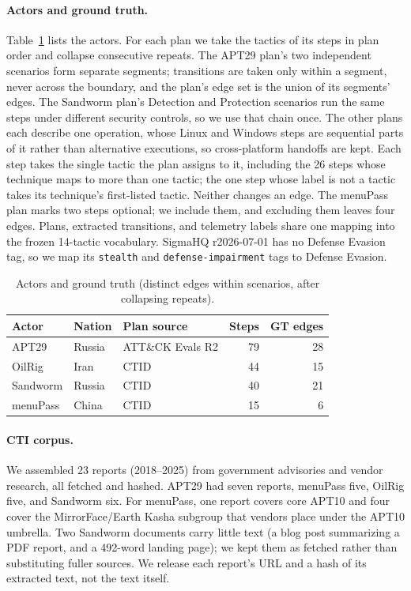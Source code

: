\documentclass[letterpaper]{article} %
\newif\ifflags
\newcommand{\flag}[1]{\ifflags\textcolor{red}{\textsuperscript{\textbf{[#1]}}}\fi}
\begin{document}
\paragraph{Actors and ground truth.} Table~\ref{tab:actors} lists the actors. For each plan we take the tactics of its steps in plan order and collapse consecutive repeats. The APT29 plan's two independent scenarios form separate segments; transitions are taken only within a segment, never across the boundary, and the plan's edge set is the union of its segments' edges. The Sandworm plan's Detection and Protection scenarios run the same steps under different security controls, so we use that chain once. The other plans each describe one operation, whose Linux and Windows steps are sequential parts of it rather than alternative executions, so cross-platform handoffs are kept. Each step takes the single tactic the plan assigns to it, including the 26 steps whose technique maps to more than one tactic; the one step whose label is not a tactic takes its technique's first-listed tactic. Neither changes an edge. The menuPass plan marks two steps optional; we include them, and excluding them leaves four edges. Plans, extracted transitions, and telemetry labels share one mapping into the frozen 14-tactic vocabulary. SigmaHQ r2026-07-01 has no Defense Evasion tag, so we map its \texttt{stealth} and \texttt{defense-impairment} tags to Defense Evasion.

\begin{table}[t]
\centering
\small
\begin{tabular}{@{}lllrr@{}}
\toprule
Actor & Nation & Plan source & Steps & GT edges \\
\midrule
APT29 & Russia & ATT\&CK Evals R2 & 79 & 28 \\
OilRig & Iran & CTID & 44 & 15 \\
Sandworm & Russia & CTID & 40 & 21 \\
menuPass & China & CTID & 15 & 6 \\
\bottomrule
\end{tabular}
\caption{Actors and ground truth (distinct edges within scenarios, after collapsing repeats).}
\label{tab:actors}
\end{table}

\paragraph{CTI corpus.} We assembled 23 reports (2018--2025) from government advisories and vendor research, all fetched and hashed. APT29 had seven reports, menuPass five, OilRig five, and Sandworm six. For menuPass, one report covers core APT10 and four cover the MirrorFace/Earth Kasha subgroup that vendors place under the APT10 umbrella.\flag{F6} Two Sandworm documents carry little text (a blog post summarizing a PDF report, and a 492-word landing page); we kept them as fetched rather than substituting fuller sources. We release each report's URL and a hash of its extracted text, not the text itself.
\end{document}
